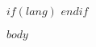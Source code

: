 \documentclass[fleqn,$fontsize$]{latex/stylish_article} %
\affiliation{
$for(affiliation)$\textsuperscript{$affiliation.affsuperscript$}$affiliation.dptuniv$\\ \hspace{1em} $affiliation.address$$sep$\\$endfor$
}
\affiliation{*\textbf{$corrauthorlabel$}: $corrauthor.email$, $if(corrauthor.url)$$corrauthor.url$$endif$} %
\begin{document}
$if(lang)$
$endif$

\flushbottom %

\maketitle %


\thispagestyle{empty} %


$body$



\makeatletter

\makeatother


\end{document}

